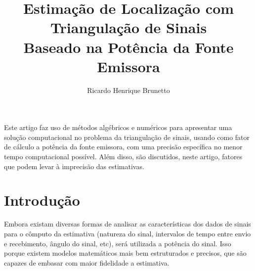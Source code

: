 

\sloppy

\title{Estimação de Localização com Triangulação de Sinais\\Baseado na Potência da Fonte Emissora}

\author{Ricardo Henrique Brunetto}


\address{Departamento de Informática -- Universidade Estadual de Maringá (UEM)\\
	Maringá -- PR -- Brasil
}



	\maketitle

	\begin{resumo}
		Este artigo faz uso de métodos algébricos e numéricos para apresentar uma solução computacional
		no problema da triangulação de sinais, usando como fator de cálculo a potência da fonte emissora,
		com uma precisão específica no menor tempo computacional possível. Além disso, são discutidos, neste artigo,
		fatores que podem levar à imprecisão das estimativas.
	\end{resumo}

  \section{Introdução}
	\label{sec:introducao}
	Embora existam diversas formas de analisar as características dos dados de sinais para o cômputo
	da estimativa (natureza do sinal, intervalos de tempo entre envio e recebimento, ângulo do sinal, etc),
	será utilizada a potência do sinal. Isso porque existem modelos matemáticos mais bem
	estruturados e precisos, que são capazes de embasar com maior fidelidade a estimativa.

